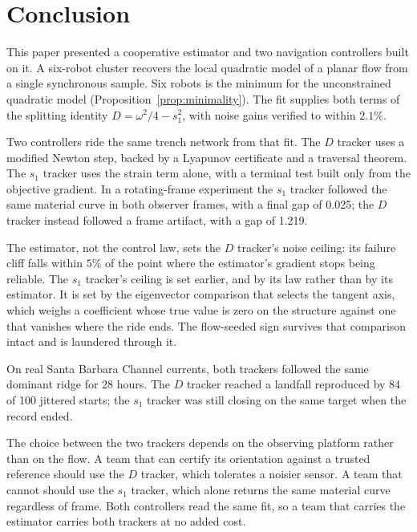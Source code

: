 \documentclass[lettersize,journal]{IEEEtran}
\begin{document}
\section{Conclusion}
\label{sec:conclusion}


This paper presented a cooperative estimator and two navigation
controllers built on it. A six-robot cluster recovers the local
quadratic model of a planar flow from a single synchronous sample.
Six robots is the minimum for the unconstrained quadratic model
(Proposition~\ref{prop:minimality}). The fit supplies both terms of the
splitting identity $D = \omega^2/4 - s_1^2$, with noise gains verified
to within $2.1\%$.

Two controllers ride the same trench network from that fit. The $D$
tracker uses a modified Newton step, backed by a Lyapunov certificate
and a traversal theorem. The $s_1$ tracker uses the strain term alone,
with a terminal test built only from the objective gradient. In a
rotating-frame experiment the $s_1$ tracker followed the same material
curve in both observer frames, with a final gap of 0.025; the $D$
tracker instead followed a frame artifact, with a gap of 1.219.

The estimator, not the control law, sets the $D$ tracker's noise
ceiling: its failure cliff falls within $5\%$ of the point where the
estimator's gradient stops being reliable. The $s_1$ tracker's ceiling
is set earlier, and by its law rather than by its estimator. It is set
by the eigenvector comparison that selects the tangent axis, which
weighs a coefficient whose true value is zero on the structure against
one that vanishes where the ride ends. The flow-seeded sign survives
that comparison intact and is laundered through it.

On real Santa Barbara Channel currents, both trackers followed the same
dominant ridge for 28 hours. The $D$ tracker reached a landfall
reproduced by 84 of 100 jittered starts; the $s_1$ tracker was still
closing on the same target when the record ended.

The choice between the two trackers depends on the observing platform
rather than on the flow. A team that can certify its orientation
against a trusted reference should use the $D$ tracker, which tolerates
a noisier sensor. A team that cannot should use the $s_1$ tracker,
which alone returns the same material curve regardless of frame. Both
controllers read the same fit, so a team that carries the estimator
carries both trackers at no added cost.
\end{document}
